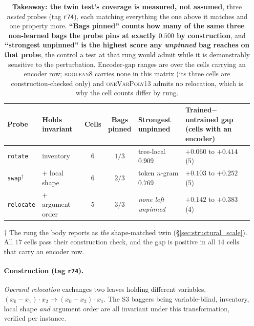 \begin{table}[h]
\centering
\begin{threeparttable}
\footnotesize
\caption{\textbf{Takeaway: the twin test's coverage is measured, not assumed}, three \emph{nested} probes (tag \texttt{r74}), each matching everything the one above it matches and one property more. \textbf{``Bags pinned'' counts how many of the same three non-learned bags the probe pins at exactly $0.500$ by construction}, and \textbf{``strongest unpinned'' is the highest score any \emph{unpinned} bag reaches on that probe}, the control a test at that rung would admit while it is demonstrably sensitive to the perturbation. Encoder-gap ranges are over the cells carrying an encoder row; \textsc{boolean8} carries none in this matrix (its three cells are construction-checked only) and \textsc{oneVarPoly13} admits no relocation, which is why the cell counts differ by rung.}
\label{tab:probe_ladder}
\setlength{\tabcolsep}{4pt}
\begin{tabular}{@{}l l c c l l@{}}
\toprule
Probe & Holds invariant & Cells & \makecell{Bags\\pinned} & Strongest unpinned & \makecell{Trained$-$untrained gap\\(cells with an encoder)} \\
\midrule
\texttt{rotate}   & inventory                       & $6$ & $1/3$ & tree-local $\mathbf{0.909}$ & $+0.060$ to $+0.414$ \quad(5) \\
\texttt{swap}$^{\dagger}$ & $+$ local shape         & $6$ & $2/3$ & token $n$-gram $0.769$ & $+0.103$ to $+0.252$ \quad(5) \\
\texttt{relocate} & $+$ argument order              & $5$ & $3/3$ & \emph{none left unpinned} & $+0.142$ to $+0.383$ \quad(4) \\
\bottomrule
\end{tabular}
\begin{tablenotes}[flushleft]\footnotesize
\item[$\dagger$] The rung the body reports as \emph{the} shape-matched twin (\S\ref{sec:structural_scale}). All $17$ cells pass their construction check, and the gap is positive in all $14$ cells that carry an encoder row.
\end{tablenotes}
\end{threeparttable}
\end{table}

\paragraph{Construction (tag \texttt{r74}).} \emph{Operand relocation} exchanges two leaves holding different variables, $(x_0 - x_1)\cdot x_2 \to (x_0 - x_2)\cdot x_1$. The S3 baggers being variable-blind, inventory, local shape \emph{and} argument order are all invariant under this transformation, verified per instance.

